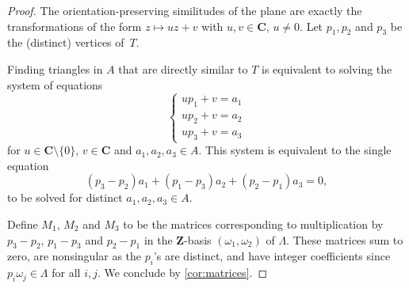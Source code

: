 \documentclass{daj}
\theoremstyle{definition}
\newcommand{\R}{\ensuremath{\mathbf{R}}}
\newcommand{\C}{\ensuremath{\mathbf{C}}}
\newcommand{\Z}{\ensuremath{\mathbf{Z}}}
\begin{document}
\begin{proof}
The orientation-preserving similitudes of the plane are exactly the transformations of the form $z \mapsto uz+v$ with $u, v\in \C$, $u\neq 0$. Let $p_1, p_2$ and $p_3$ be the (distinct) vertices of~$T$. 

Finding triangles in $A$ that are directly similar to $T$ is equivalent to solving the system of equations 
\begin{equation*}
\left\{
\begin{array}{c}
up_1+v = a_1\\
up_2+v = a_2\\
up_3+v = a_3
\end{array} \right.
\end{equation*}
for $u\in \C\setminus \{0\}$, $v\in \C$ and $a_1, a_2, a_3\in A$. This system is equivalent to the single equation
\begin{equation*}
(p_3-p_2)a_1 + (p_1-p_3)a_2 + (p_2-p_1)a_3 = 0,
\end{equation*}
to be solved for distinct $a_1, a_2, a_3\in A$. 

Define $M_1$, $M_2$ and $M_3$ to be the matrices corresponding to multiplication by $p_3-p_2$, $p_1-p_3$ and $p_2-p_1$ in the $\Z$-basis $(\omega_1, \omega_2)$ of $\Lambda$. These matrices sum to zero, are nonsingular as the $p_i$'s are distinct, and have integer coefficients since $p_i\omega_j\in  \Lambda$ for all $i,j$. We conclude by \cref{cor:matrices}.
\end{proof}
\end{document}
